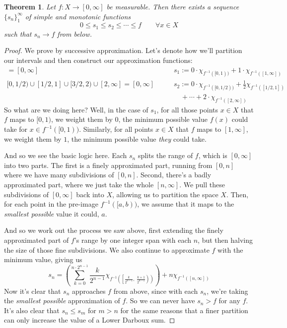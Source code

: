 \documentclass[12pt]{article}
\theoremstyle{plain}
\newtheorem{thm}{Theorem}[subsection]
\theoremstyle{definition}
\theoremstyle{remark}
\begin{document}
\begin{thm}
\label{lebapprox}
Let $f: X\rightarrow[0,\infty]$ be measurable. Then there exists a sequence $\{s_n\}^\infty_1$ of simple and monotonic functions 
\[
    0 \leq s_1 \leq s_2 \leq \cdots \leq f 
    \qquad \forall x\in X
\]
such that $s_n\rightarrow f$ from below.
\end{thm}
\begin{proof}
We prove by successive approximation. Let's denote how we'll partition our intervals and then construct our approximation functions:
\begin{align*}
    [0,1) \cup [1,\infty] = [0,\infty] \quad&\quad  
        s_1 := 0\cdot \chi_{f^{-1}([0,1) )}
        + 1 \cdot \chi_{f^{-1}([1,\infty] )} \\
    [0,1/2) \cup [1/2,1] \cup [3/2, 2)
        \cup [2, \infty] = [0,\infty] \quad&\quad  
        s_2 := 0\cdot \chi_{f^{-1}([0,1/2) )}
        + \frac{1}{2} \chi_{f^{-1}([1/2,1] )} \\
    &\qquad
        + \cdots
        + 2 \cdot \chi_{f^{-1}([2,\infty] )} 
\end{align*}
So what are we doing here? Well, in the case of $s_1$, for all those points $x\in X$ that $f$ maps to $[0,1)$, we weight them by $0$, the minimum possible value $f(x)$ could take for $x\in f^{-1}([0,1))$. Similarly, for all points $x\in X$ that $f$ maps to $[1,\infty]$, we weight them by $1$, the minimum possible value \emph{they} could take.  

And so we see the basic logic here. Each $s_n$ splits the range of $f$, which is $[0,\infty]$ into two parts. The first is a finely approximated part, running from $[0,n]$ where we have many subdivisions of $[0,n]$. Second, there's a badly approximated part, where we just take the whole $[n,\infty]$. We pull these subdivisions of $[0,\infty]$ back into $X$, allowing us to partition the space $X$. Then, for each point in the pre-image $f^{-1}([a,b))$, we assume that it maps to the \emph{smallest possible} value it could, $a$.

And so we work out the process we saw above, first extending the finely approximated part of $f$'s range by one integer span with each $n$, but then halving the size of those fine subdivisions. We also continue to approximate $f$ with the minimum value, giving us
\[
    s_n = \left(\sum^{n\cdot 2^{n-1}}_{k=0}\frac{k}{2^{n-1}}
    \chi_{f^{-1}\left( \left[\frac{k}{2^{n-1}}, \;
        \frac{k+1}{2^{n-1}} \right)\right)}\right)
        + n \chi_{f^{-1}\left([n,\infty]\right)}
\]
Now it's clear that $s_n$ approaches $f$ from above, since with each $s_n$, we're taking the \emph{smallest possible} approximation of $f$. So we can never have $s_n>f$ for any $f$. It's also clear that $s_n\leq s_m$ for $m>n$ for the same reasons that a finer partition can only increase the value of a Lower Darboux sum.


\end{proof}
\end{document}
